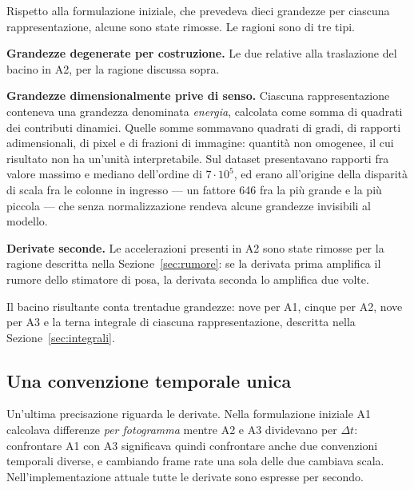 Rispetto alla formulazione iniziale, che prevedeva dieci grandezze per ciascuna
rappresentazione, alcune sono state rimosse. Le ragioni sono di tre tipi.

\textbf{Grandezze degenerate per costruzione.} Le due relative alla traslazione
del bacino in A2, per la ragione discussa sopra.

\textbf{Grandezze dimensionalmente prive di senso.} Ciascuna rappresentazione
conteneva una grandezza denominata \emph{energia}, calcolata come somma di
quadrati dei contributi dinamici. Quelle somme sommavano quadrati di gradi, di
rapporti adimensionali, di pixel e di frazioni di immagine: quantità non
omogenee, il cui risultato non ha un'unità interpretabile. Sul dataset
presentavano rapporti fra valore massimo e mediano dell'ordine di $7\cdot10^5$,
ed erano all'origine della disparità di scala fra le colonne in ingresso — un
fattore 646 fra la più grande e la più piccola — che senza normalizzazione
rendeva alcune grandezze invisibili al modello.

\textbf{Derivate seconde.} Le accelerazioni presenti in A2 sono state rimosse
per la ragione descritta nella Sezione~\ref{sec:rumore}: se la derivata prima
amplifica il rumore dello stimatore di posa, la derivata seconda lo amplifica
due volte.

Il bacino risultante conta trentadue grandezze: nove per A1, cinque per A2, nove
per A3 e la terna integrale di ciascuna rappresentazione, descritta nella
Sezione~\ref{sec:integrali}.

\subsection{Una convenzione temporale unica}

Un'ultima precisazione riguarda le derivate. Nella formulazione iniziale A1
calcolava differenze \emph{per fotogramma} mentre A2 e A3 dividevano per
$\Delta t$: confrontare A1 con A3 significava quindi confrontare anche due
convenzioni temporali diverse, e cambiando frame rate una sola delle due
cambiava scala. Nell'implementazione attuale tutte le derivate sono espresse per
secondo.
